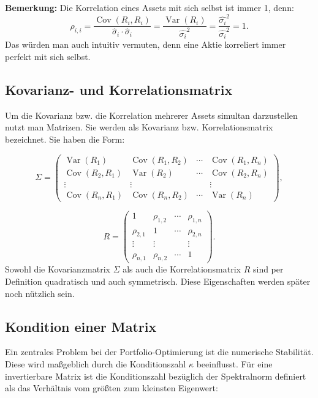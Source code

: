 \documentclass[parskip=half]{scrartcl}
\begin{document}
	\textbf{Bemerkung:} Die Korrelation eines Assets mit sich selbst ist immer 1, denn:
	\begin{equation}
		\rho_{i,i} = \frac{\operatorname{Cov}(R_i,R_i)}{\hat{\sigma}_i \cdot \hat{\sigma}_i} = \frac{\operatorname{Var}(R_i)}{\hat{\sigma_i}^2} = \frac{\hat{\sigma_i}^2}{\hat{\sigma_i}^2} = 1.
	\end{equation}
	Das würden man auch intuitiv vermuten, denn eine Aktie korreliert immer perfekt mit sich selbst.
	
	\subsection{Kovarianz- und Korrelationsmatrix}
	Um die Kovarianz bzw. die Korrelation mehrerer Assets simultan darzustellen nutzt man Matrizen. Sie werden als Kovarianz bzw. Korrelationsmatrix bezeichnet.
	Sie haben die Form:
	
	\begin{equation}
		\Sigma = \begin{pmatrix}
			\operatorname{Var}(R_1) & \operatorname{Cov}(R_1,R_2) & \cdots & \operatorname{Cov}(R_1,R_n) 	\\
			\operatorname{Cov}(R_2,R_1) & \operatorname{Var}(R_2) & \cdots & \operatorname{Cov}(R_2,R_n) 	\\
			\vdots & \vdots &  & \vdots										 								\\
			\operatorname{Cov}(R_n,R_1) & \operatorname{Cov}(R_n,R_2) & \cdots & \operatorname{Var}(R_n)
		\end{pmatrix},										\label{eq:kovarianzmatrix}
	\end{equation}
	
	\begin{equation}
		R = \begin{pmatrix}
			1 & \rho_{1,2} & \cdots & \rho_{1,n} 	\\
			\rho_{2,1} & 1 & \cdots & \rho_{2,n} 	\\
			\vdots & \vdots &  & \vdots 				\\
			\rho_{n,1} & \rho_{n,2} & \cdots & 1
		\end{pmatrix}. 										\label{eq:korrelationsmatrix}
	\end{equation}
	Sowohl die Kovarianzmatrix $\Sigma$ als auch die Korrelationsmatrix $R$ sind per Definition quadratisch und auch symmetrisch. Diese Eigenschaften werden später noch nützlich sein.
	
	
	\subsection{Kondition einer Matrix}
	Ein zentrales Problem bei der Portfolio-Optimierung ist die numerische Stabilität. Diese wird maßgeblich durch die Konditionszahl $\kappa$ beeinflusst. Für eine invertierbare Matrix ist die Konditionszahl bezüglich der Spektralnorm definiert als das Verhältnis vom größten zum kleinsten Eigenwert:
	
\end{document}
